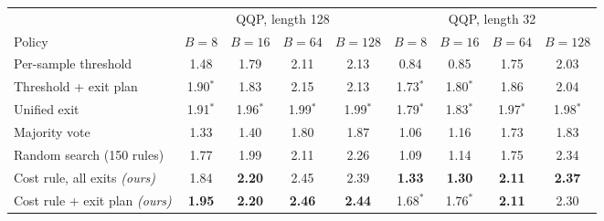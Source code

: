 \begin{tabular}{@{}lcccccccc@{}}
\toprule
 & \multicolumn{4}{c}{QQP, length 128} & \multicolumn{4}{c}{QQP, length 32} \\
\cmidrule(lr){2-5}\cmidrule(lr){6-9}
Policy & $B=8$ & $B=16$ & $B=64$ & $B=128$ & $B=8$ & $B=16$ & $B=64$ & $B=128$ \\
\midrule
Per-sample threshold & 1.48 & 1.79 & 2.11 & 2.13 & 0.84 & 0.85 & 1.75 & 2.03 \\
Threshold + exit plan & 1.90$^{*}$ & 1.83 & 2.15 & 2.13 & 1.73$^{*}$ & 1.80$^{*}$ & 1.86 & 2.04 \\
Unified exit & 1.91$^{*}$ & 1.96$^{*}$ & 1.99$^{*}$ & 1.99$^{*}$ & 1.79$^{*}$ & 1.83$^{*}$ & 1.97$^{*}$ & 1.98$^{*}$ \\
Majority vote & 1.33 & 1.40 & 1.80 & 1.87 & 1.06 & 1.16 & 1.73 & 1.83 \\
Random search (150 rules) & 1.77 & 1.99 & 2.11 & 2.26 & 1.09 & 1.14 & 1.75 & 2.34 \\
\midrule
Cost rule, all exits \textit{(ours)} & 1.84 & \textbf{2.20} & 2.45 & 2.39 & \textbf{1.33} & \textbf{1.30} & \textbf{2.11} & \textbf{2.37} \\
Cost rule + exit plan \textit{(ours)} & \textbf{1.95} & \textbf{2.20} & \textbf{2.46} & \textbf{2.44} & 1.68$^{*}$ & 1.76$^{*}$ & \textbf{2.11} & 2.30 \\
\bottomrule
\end{tabular}
